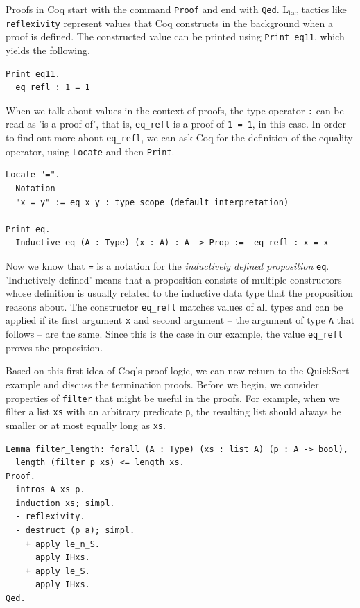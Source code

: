 \documentclass[a4paper, 11pt, fleqn, twoside]{scrreprt}
\newcommand{\cinl}[1]{\texttt{#1}}
\begin{document}
Proofs in Coq start with the command \cinl{Proof} and end with \cinl{Qed}.
L$_\text{tac}$ tactics like \cinl{reflexivity} represent values that Coq constructs in the background when a proof is defined.
The constructed value can be printed using \cinl{Print eq11}, which yields the following.

\begin{verbatim}
Print eq11.
  eq_refl : 1 = 1
\end{verbatim}

When we talk about values in the context of proofs, the type operator \cinl{:} can be read as 'is a proof of', that is, \cinl{eq_refl} is a proof of \cinl{1 = 1}, in this case.
In order to find out more about \cinl{eq_refl}, we can ask Coq for the definition of the equality operator, using \cinl{Locate} and then \cinl{Print}.

\begin{verbatim}
Locate "=".
  Notation
  "x = y" := eq x y : type_scope (default interpretation)

Print eq.
  Inductive eq (A : Type) (x : A) : A -> Prop :=  eq_refl : x = x
\end{verbatim}

Now we know that \cinl{=} is a notation for the \textit{inductively defined proposition} \cinl{eq}.
'Inductively defined' means that a proposition consists of multiple constructors whose definition is usually related to the inductive data type that the proposition reasons about.
The constructor \cinl{eq_refl} matches values of all types and can be applied if its first argument \cinl{x} and second argument -- the argument of type \cinl{A} that follows -- are the same.
Since this is the case in our example, the value \cinl{eq_refl} proves the proposition.

Based on this first idea of Coq's proof logic, we can now return to the QuickSort example and discuss the termination proofs.
Before we begin, we consider properties of \cinl{filter} that might be useful in the proofs.
For example, when we filter a list \cinl{xs} with an arbitrary predicate \cinl{p}, the resulting list should always be smaller or at most equally long as \cinl{xs}.

\begin{verbatim}
Lemma filter_length: forall (A : Type) (xs : list A) (p : A -> bool),
  length (filter p xs) <= length xs.
Proof.
  intros A xs p.
  induction xs; simpl.
  - reflexivity.
  - destruct (p a); simpl.
    + apply le_n_S.
      apply IHxs.
    + apply le_S.
      apply IHxs.
Qed.
\end{verbatim}
\end{document}
